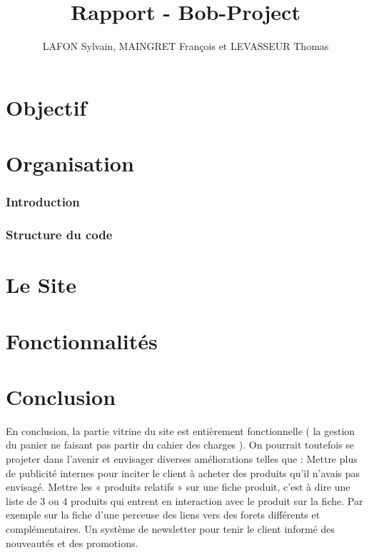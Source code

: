 \documentclass[10pt,a4paper]{article}
\author{LAFON Sylvain, MAINGRET François et LEVASSEUR Thomas}
\title{Rapport - Bob-Project}
\begin{document}
	\maketitle
	\tableofcontents
	\newpage

	\part{Objectif}
		
	
	\newpage
	\part{Organisation}
		\section{Introduction}
			

		\section{Structure du code}
			
	\newpage
	\part{Le Site}		
		
	\newpage
	\part{Fonctionnalités}
		

	\newpage
	\part{Conclusion}
	En conclusion, la partie vitrine du site est entièrement fonctionnelle ( la gestion du panier ne faisant pas partir du cahier des charges ). On pourrait toutefois se projeter dans l'avenir et envisager diverses améliorations telles que :
Mettre plus de publicité internes pour inciter le client à acheter des produits qu'il n'avais pas envisagé.
Mettre les « produits relatifs » sur une fiche produit, c'est à dire une liste de 3 ou 4 produits qui entrent en interaction avec le produit sur la fiche. Par exemple sur la fiche d'une perceuse des liens vers des forets différents et complémentaires.
Un système de newsletter pour tenir le client informé des nouveautés et des promotions.
\end{document}
